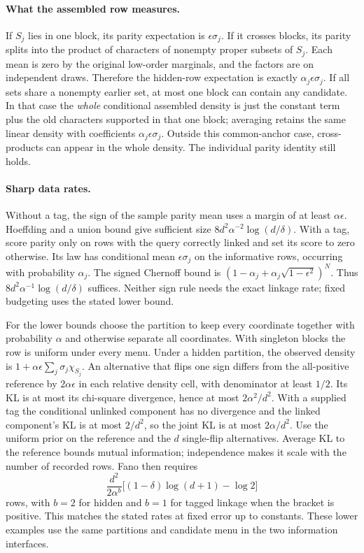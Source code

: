 \documentclass{article}
\begin{document}
\paragraph{What the assembled row measures.}
If \(S_j\) lies in one block, its parity expectation is
\(\epsilon\sigma_j\). If it crosses blocks, its parity splits
into the product of characters of nonempty proper subsets
of \(S_j\). Each mean is zero by the original low-order
marginals, and the factors are on independent draws.
Therefore the hidden-row expectation is exactly
\(\alpha_j\epsilon\sigma_j\).
If all sets share a nonempty earlier set, at most one block
can contain any candidate. In that case the \emph{whole}
conditional assembled density is just the constant term plus
the old characters supported in that one block; averaging retains
the same linear density with coefficients
\(\alpha_j\epsilon\sigma_j\). Outside this common-anchor case,
cross-products can appear in the whole density. The individual
parity identity still holds.

\paragraph{Sharp data rates.}
Without a tag, the sign of the sample parity mean uses a
margin of at least \(\alpha\epsilon\). Hoeffding and a union
bound give sufficient size
\(8d^2\alpha^{-2}\log(d/\delta)\).
With a tag, score parity only on rows with the
query correctly linked and set its score to zero otherwise.
Its law has conditional mean \(\epsilon\sigma_j\) on
the informative rows, occurring with probability \(\alpha_j\).
The signed Chernoff bound is
\((1-\alpha_j+\alpha_j\sqrt{1-\epsilon^2})^N\).
Thus \(8d^2\alpha^{-1}\log(d/\delta)\) suffices.
Neither sign rule needs the exact linkage rate; fixed
budgeting uses the stated lower bound.

For the lower bounds choose the partition to keep every
coordinate together with probability \(\alpha\) and otherwise
separate all coordinates. With singleton blocks the row is
uniform under every menu. Under a hidden partition, the
observed density is \(1+\alpha\epsilon\sum_j\sigma_j\chi_{S_j}\).
An alternative that flips one sign differs from the all-positive
reference by \(2\alpha\epsilon\) in each relative density cell,
with denominator at least \(1/2\). Its KL is at most its
chi-square divergence, hence at most \(2\alpha^2/d^2\).
With a supplied tag the conditional unlinked component has
no divergence and the linked component's KL is at most
\(2/d^2\), so the joint KL is at most \(2\alpha/d^2\).
Use the uniform prior on the reference and the \(d\)
single-flip alternatives. Average KL to the reference
bounds mutual information; independence makes it scale
with the number of recorded rows. Fano then requires
\[
 \frac{d^2}{2\alpha^b}
 \big[(1-\delta)\log(d+1)-\log2\big]
\]
rows, with \(b=2\) for hidden and \(b=1\) for tagged linkage
when the bracket is positive. This matches the stated rates at
fixed error up to constants. These lower examples use the
same partitions and candidate menu in the two information
interfaces.
\end{document}
